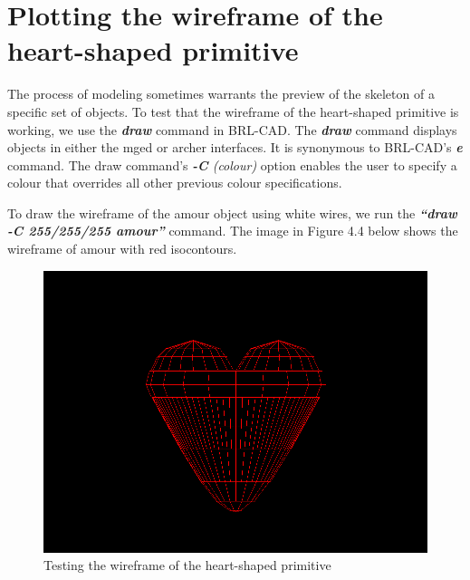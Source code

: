 \section{Plotting the wireframe of the heart­-shaped primitive}

\hspace{30} The   process   of   modeling   sometimes   warrants   the   preview   of   the   skeleton  
of   a   specific   set   of   objects.   To   test   that   the   wireframe   of   the   heart­-shaped  
primitive   is   working,   we   use   the   \textit{\textbf{draw}} \cite{40}   command   in   BRL­-CAD.   The   \textit{\textbf{draw}}  
command   displays   objects   in   either   the   mged   or   archer   interfaces.   It   is  
synonymous   to   BRL­-CAD's   \textit{\textbf{e}}   command.   The   draw   command's   \textit{\textbf{-­C} (colour)}  
option   enables   the   user   to   specify   a   colour   that   overrides   all   other   previous  
colour specifications.  

\hspace{30} To   draw   the   wireframe   of   the   amour   object   using   white   wires,   we   run   the  
\textit{\textbf{“draw -­C 255/255/255 amour”}}   command.   The   image   in   Figure   4.4   below   shows  
the wireframe of amour with red iso­contours.  

\begin{figure}[htbp]
\centering
\includegraphics[trim=0.0cm 0.5cm 0.1cm 0.1cm, clip=true, totalheight=0.4\textheight]{Pictures/Wireframe.png}
\caption[Testing the wireframe of the heart-­shaped primitive]{Testing the wireframe of the heart-­shaped primitive}
\label{Wireframe}
\end{figure}

